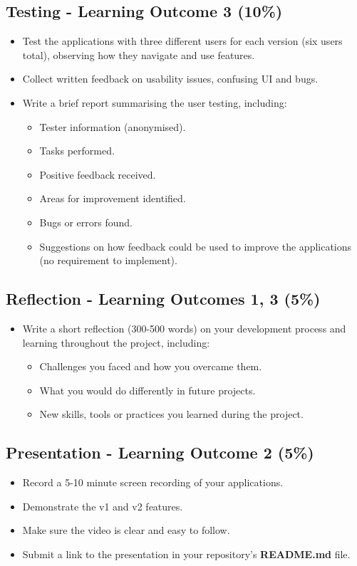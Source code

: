\documentclass{article}
\begin{document}
\subsection*{Testing - Learning Outcome 3 (10\%)}
\begin{itemize}
  \item Test the applications with three different users for each version (six users total), observing how they navigate and use features.
  \item Collect written feedback on usability issues, confusing UI and bugs.
  \item Write a brief report summarising the user testing, including:
  \begin{itemize}
    \item Tester information (anonymised).
    \item Tasks performed.
    \item Positive feedback received.
    \item Areas for improvement identified.
    \item Bugs or errors found.
    \item Suggestions on how feedback could be used to improve the applications (no requirement to implement).
  \end{itemize}
\end{itemize}

\subsection*{Reflection - Learning Outcomes 1, 3 (5\%)}
\begin{itemize}
  \item Write a short reflection (300-500 words) on your development process and learning throughout the project, including:
  \begin{itemize}
    \item Challenges you faced and how you overcame them.
    \item What you would do differently in future projects.
    \item New skills, tools or practices you learned during the project.
  \end{itemize}
\end{itemize}

\subsection*{Presentation - Learning Outcome 2 (5\%)}
\begin{itemize}
  \item Record a 5-10 minute screen recording of your applications.
  \item Demonstrate the v1 and v2 features.
  \item Make sure the video is clear and easy to follow.
  \item Submit a link to the presentation in your repository's \textbf{README.md} file.
\end{itemize}
\end{document}

